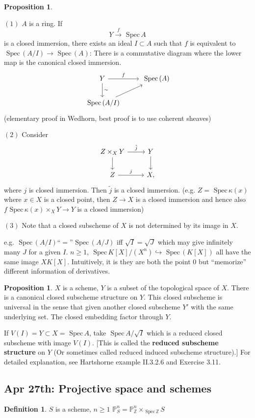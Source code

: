 \documentclass[11pt]{article}
\theoremstyle{definition}
\newtheorem{prop}[thm]{Proposition}
\newtheorem{dfn}[thm]{Definition}
\newcommand{\spec}{\text{ Spec}\,}
\newcommand{\proj}{\mathbb P}
\newcommand{\intg}{\mathbb Z}
\newcommand{\lrta}{\longrightarrow}
\newcommand{\inj}{\hookrightarrow}
\begin{document}
\begin{prop}\ 

$(1)$
$A$ is a ring. If 
$$
Y\overset{f}{\lrta} \spec A
$$ 
is a closed immersion, there exists an ideal $I\subset A$ such that $f$ is equivalent to $\spec(A/I)\lrta \spec (A)$: There is a commutative diagram where the lower map is the canonical closed immersion.
$$
\begin{tikzcd}
Y \arrow[r, "f"] \arrow[d, "\sim"] & \spec(A) \\
\spec(A/I) \arrow[ru] & 
\end{tikzcd}
$$
(elementary proof in Wedhorn, best proof is to use coherent sheaves)

$(2)$ Consider
$$
\begin{tikzcd}
Z\times_X Y \arrow[r, "\tilde{j}"] \arrow[d] & Y \arrow[d] \\
Z \arrow[r, "j"] & X,
\end{tikzcd}
$$ 
where $j$ is closed immersion. Then $\tilde{j}$ is a closed immersion. (e.g. $Z=\spec \kappa(x)$ where $x\in X$ is a closed point, then $Z\lrta X$ is a closed immersion and hence also $f\spec \kappa(x)\times_X Y\lrta Y$ is a closed immersion)

$(3)$ Note that a closed subscheme of $X$ is not determined by its image in $X$.

e.g. $\spec(A/I)$``$=$''$\spec (A/J)$ iff $\sqrt{I}=\sqrt{J}$ which may give  infinitely many $J$ for  a given $I$.
$n\geq 1$, $\spec K[X]/(X^n)\inj \spec(K[X])$ all have the same image $XK[X]$. Intuitively, it is they are both the point $0$ but ``memorize'' different information of derivatives.
\end{prop}

\begin{prop}
$X$ is a scheme, $Y$ is a subset of  the topological space of $X$. There is a canonical closed subscheme structure on $Y$. This closed subscheme is universal in the sense that given another closed subscheme $Y'$ with  the same underlying set. The closed embedding factor through $Y$.
\end{prop}
If $V(I)=Y\subset X=\spec A$, take $\spec A/\sqrt{I}$ which is a reduced closed subscheme with image $V(I)$. [This is called the \textbf{reduced subscheme structure} on $Y$ (Or sometimes called reduced induced subscheme structure).]
For detailed explanation, see Hartshorne example II.3.2.6 and Exercise 3.11.

\subsection{Apr 27th: Projective space and schemes}
\begin{dfn}
$S$ is a scheme, $n\geq 1$ $\proj^n_S=\proj^n_\intg\times_{\spec \intg} S$
\end{dfn}
\end{document}

